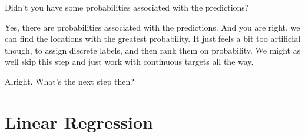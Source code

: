 {\color{blue} Didn't you have some probabilities associated with the predictions?}

Yes, there are probabilities associated with the predictions. And you are right, we can find the locations with the greatest probability. It just feels a bit too artificial though, to assign discrete labels, and then rank them on probability. We might as well skip this step and just work with continuous targets all the way. 

{\color{blue} Alright. What's the next step then?}


\section{Linear Regression}

